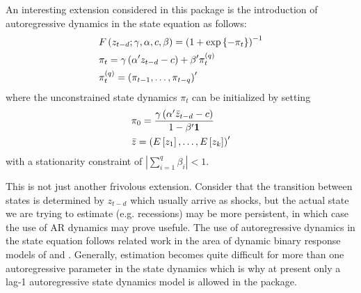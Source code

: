 An interesting extension considered in this package is the introduction of
autoregressive dynamics in the state equation as follows:
\begin{equation}\label{eq:star_new}
\begin{gathered}
  F\left( {{z_{t - d}};\gamma ,\alpha ,c,\beta } \right) = {\left( {1 + \exp \left\{ { - {\pi _t}} \right\}} \right)^{ - 1}} \hfill \\
  {\pi _t} = \gamma \left( {\alpha '{z_{t - d}} - c} \right) + \beta '\pi _t^{\left( q \right)} \hfill \\
  \pi _t^{\left( q \right)} = {\left( {{\pi _{t - 1}}, \ldots ,{\pi _{t - q}}} \right)^\prime } \hfill \\ 
\end{gathered}
\end{equation}
where the unconstrained state dynamics $\pi_t$ can be initialized by setting
\begin{equation}
\begin{gathered}
  {\pi _0} = \frac{{\gamma \left( {\alpha '{{\bar z}_{t - d}} - c} \right)}}
{{1 - \beta '{\mathbf{1}}}} \hfill \\
  \bar z = {\left( {E\left[ {{z_1}} \right], \ldots ,E\left[ {{z_k}} \right]} \right)^\prime } \hfill \\ 
\end{gathered}
\end{equation}
with a stationarity constraint of $\left| {\sum\limits_{i = 1}^q {{\beta _i}} } \right| < 1$.

This is not just another frivolous extension. Consider that the transition
between states is determined by $z_{t-d}$ which usually arrive as shocks, but
the actual state we are trying to estimate (e.g. recessions) may be more
persistent, in which case the use of AR dynamics may prove usefule. The use of
autoregressive dynamics in the state equation follows related work in the area 
of dynamic binary response models of \cite{Kauppi2008} and \cite{Nyberg2010}.
Generally, estimation becomes quite difficult for more than one autoregressive
parameter in the state dynamics which is why at present only a lag-1
autoregressive state dynamics model is allowed in the package.

